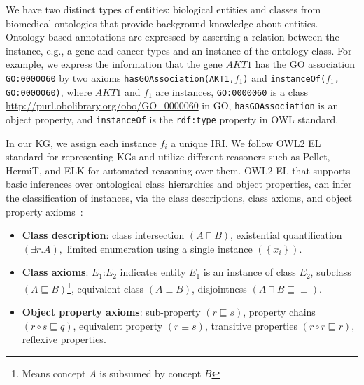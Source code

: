 \hspace*{3.5mm} We have two distinct types of entities: biological entities and classes from biomedical ontologies that provide background knowledge about entities. Ontology-based annotations are expressed by asserting a relation between the instance, e.g., a gene and cancer types and an instance of the ontology class. For example, we express the information that the gene $AKT1$ has the GO association \texttt{GO:0000060} by two axioms \texttt{hasGOAssociation(AKT1,$f_1$)} and \texttt{instanceOf($f_1$, GO:0000060)}, where $AKT1$ and $f_1$ are instances, \texttt{GO:0000060} is a class \url{http://purl.obolibrary.org/obo/GO\_0000060} in GO, \texttt{hasGOAssociation} is an object property, and \texttt{instanceOf} is the \texttt{rdf:type} property in OWL standard. 

\hspace*{3.5mm} In our KG, we assign each instance $f_i$ a unique IRI. We follow OWL2 EL standard for representing KGs and utilize different reasoners such as Pellet, HermiT, and ELK for automated reasoning over them. OWL2 EL that supports basic inferences over ontological class hierarchies and object properties, can infer the classification of instances, via  the class descriptions, class axioms, and object property axioms~\cite{alshahrani2017neuro}: 

\begin{itemize}[noitemsep]
\vspace{-4mm}
    \item \textbf{Class description}: class intersection $(A \sqcap B)$, existential quantification $(\exists r . A),$ limited enumeration using a single instance $\left(\left\{x_{i}\right\}\right)$. 
    \item \textbf{Class axioms}: $E_{1}$:$E_{2}$ indicates entity $E_{1}$ is an instance of class $E_{2}$, subclass $(A \sqsubseteq B)$\footnote{Means concept $A$ is subsumed by concept $B$}, equivalent class $(A \equiv B)$, disjointness $(A \sqcap B \sqsubseteq \perp)$. 
    \item \textbf{Object property axioms}: sub-property $(r \sqsubseteq s)$, property chains $(r \circ s \sqsubseteq q)$, equivalent property $(r \equiv s)$, transitive properties $(r \circ r \sqsubseteq r)$, reflexive properties. 
    \vspace{-4mm}
\end{itemize}

